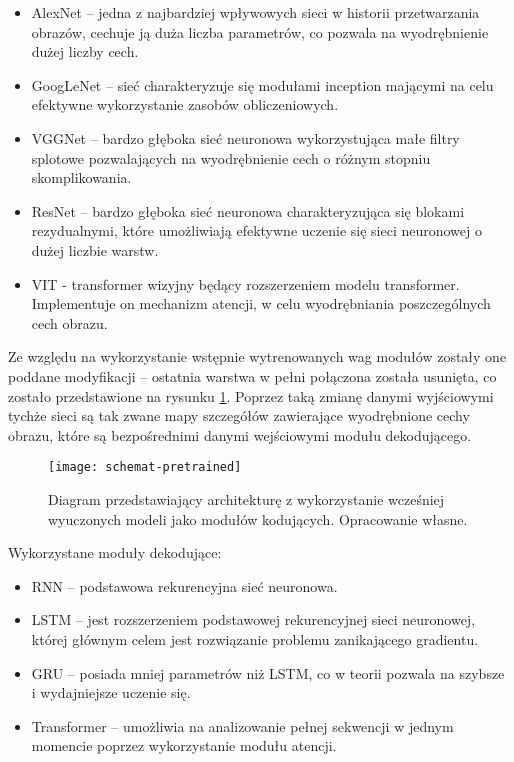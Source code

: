 \begin{itemize}
    \item AlexNet \cite{alexnet} -- jedna z najbardziej wpływowych sieci w historii przetwarzania obrazów, cechuje ją duża liczba parametrów, co pozwala na wyodrębnienie dużej liczby cech.
    \item GoogLeNet \cite{googlenet} -- sieć charakteryzuje się modułami inception mającymi na celu efektywne wykorzystanie zasobów obliczeniowych.
    \item VGGNet \cite{vggnet} -- bardzo głęboka sieć neuronowa wykorzystująca małe filtry splotowe pozwalających na wyodrębnienie cech o różnym stopniu skomplikowania.
    \item ResNet \cite{resnet} -- bardzo głęboka sieć neuronowa charakteryzująca się blokami rezydualnymi, które umożliwiają efektywne uczenie się sieci neuronowej o dużej liczbie warstw.
    \item VIT \cite{vit} - transformer wizyjny będący rozszerzeniem modelu transformer. Implementuje on mechanizm atencji, w celu wyodrębniania poszczególnych cech obrazu.
\end{itemize}
Ze względu na wykorzystanie wstępnie wytrenowanych wag modułów zostały one poddane modyfikacji -- ostatnia warstwa w pełni połączona została usunięta, co zostało przedstawione na rysunku \ref{fig:schemat-pretrained}. Poprzez taką zmianę danymi wyjściowymi tychże sieci są tak zwane mapy szczegółów zawierające wyodrębnione cechy obrazu, które są bezpośrednimi danymi wejściowymi modułu dekodującego.
\begin{figure}[H]
    \centering
    \texttt{[image: schemat-pretrained]}
    \caption{Diagram przedstawiający architekturę z wykorzystanie wcześniej wyuczonych modeli jako modułów kodujących. Opracowanie własne.}
    \label{fig:schemat-pretrained}
\end{figure}
\noindent Wykorzystane moduły dekodujące:
\begin{itemize}
    \item RNN \cite{rnn} -- podstawowa rekurencyjna sieć neuronowa.
    \item LSTM \cite{lstm} -- jest rozszerzeniem podstawowej rekurencyjnej sieci neuronowej, której głównym celem jest rozwiązanie problemu zanikającego gradientu.
    \item GRU \cite{gru} -- posiada mniej parametrów niż LSTM, co w teorii pozwala na szybsze i wydajniejsze uczenie się.
    \item Transformer \cite{transformer} -- umożliwia na analizowanie pełnej sekwencji w jednym momencie poprzez wykorzystanie modułu atencji.
\end{itemize}
